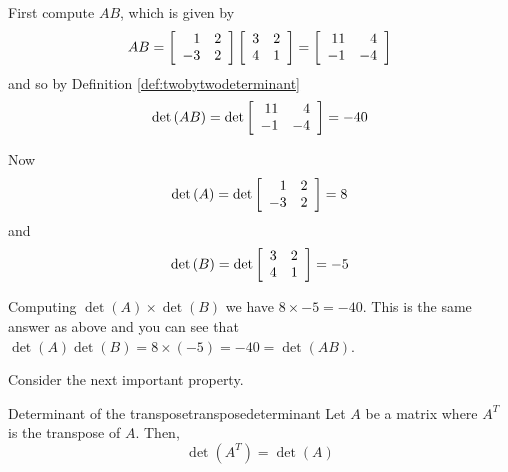 \begin{solution} First compute $AB$, which is given by 
\begin{equation*}
AB=\left[
\begin{array}{rr}
1 & 2 \\
-3 & 2
\end{array}
\right] \left[
\begin{array}{rr}
3 & 2 \\
4 & 1
\end{array}
\right] = \left[
\begin{array}{rr}
11 & 4 \\
-1 & -4
\end{array}
\right]
\end{equation*}
and so by Definition \ref{def:twobytwodeterminant}
\begin{equation*}
\det \left( AB\right) =\det \left[
\begin{array}{rr}
11 & 4 \\
-1 & -4
\end{array}
\right] = -40
\end{equation*}

Now
\begin{equation*}
\det \left( A\right) =\det \left[
\begin{array}{rr}
1 & 2 \\
-3 & 2
\end{array}
\right] = 8
\end{equation*}
and
\begin{equation*}
\det \left( B\right) =\det \left[
\begin{array}{rr}
3 & 2 \\
4 & 1
\end{array}
\right] = -5
\end{equation*}

Computing $\det \left(A\right) \times \det \left(B\right)$ we 
have $8 \times -5 = -40$. This is the same answer as above and 
you can see that $\det \left( A\right) \det \left( B\right) =8\times \left( -5\right)
=-40 = \det \left(AB\right)$. 
\end{solution}

Consider the next important property. 

\begin{theorem}{Determinant of the transpose}{transposedeterminant}
Let $A$ be a matrix where $A^T$ is the transpose of $A$. Then,
\begin{equation*}
\det\left(A^T\right) = \det \left( A \right)
\end{equation*}
\end{theorem}

